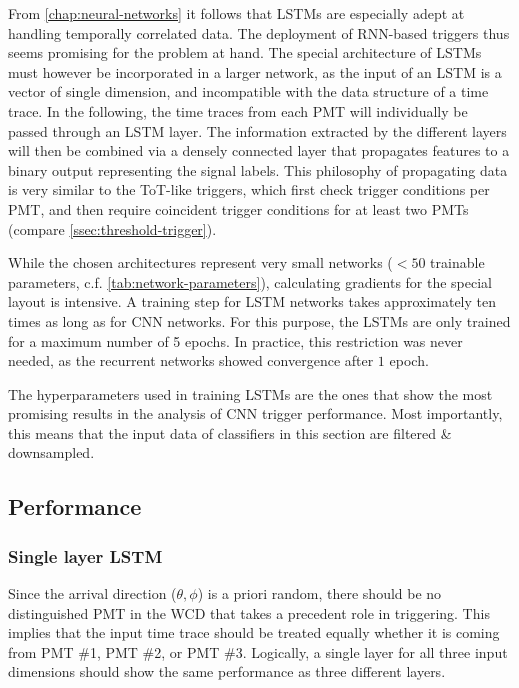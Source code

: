 From \autoref{chap:neural-networks} it follows that LSTMs are especially adept at handling temporally correlated data. The deployment of RNN-based triggers thus 
seems promising for the problem at hand. The special architecture of LSTMs must however be incorporated in a larger network, as the input of an LSTM is a 
vector of single dimension, and incompatible with the data structure of a time trace. In the following, the time traces from each PMT will individually be passed
through an LSTM layer. The information extracted by the different layers will then be combined via a densely connected layer that propagates features to a binary
output representing the signal labels. This philosophy of propagating data is very similar to the ToT-like triggers, which first check trigger conditions per PMT,
and then require coincident trigger conditions for at least two PMTs (compare \autoref{ssec:threshold-trigger}).

While the chosen architectures represent very small networks ($<50$ trainable parameters, c.f. \autoref{tab:network-parameters}), calculating gradients for the 
special layout is intensive. A training step for LSTM networks takes approximately ten times as long as for CNN networks. For this purpose, the LSTMs are only 
trained for a maximum number of 5 epochs. In practice, this restriction was never needed, as the recurrent networks showed convergence after $1$ epoch.

The hyperparameters used in training LSTMs are the ones that show the most promising results in the analysis of CNN trigger performance. Most importantly, this 
means that the input data of classifiers in this section are filtered \& downsampled.

\subsection{Performance}
\label{ssec:cnn-charge-cut}

\subsubsection{Single layer LSTM}
\label{sssec:single-layer-lsmt}

Since the arrival direction ($\theta, \phi$) is a priori random, there should be no distinguished PMT in the WCD that takes a precedent role in triggering. This 
implies that the input time trace should be treated equally whether it is coming from PMT \#1, PMT \#2, or PMT \#3. Logically, a single layer for all three input
dimensions should show the same performance as three different layers. 

